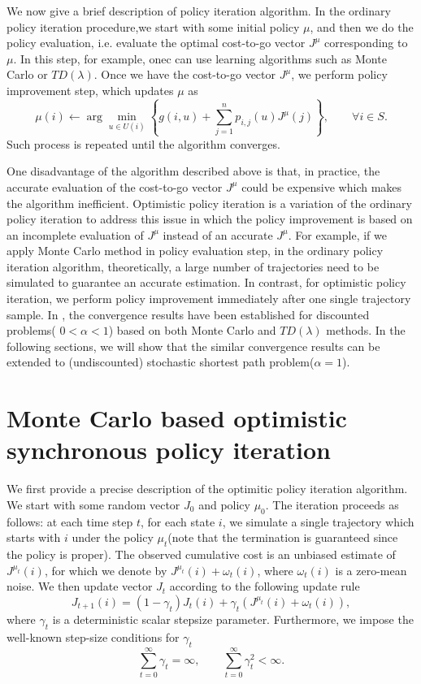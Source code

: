 \documentclass[12pt,a4paper]{amsart}
\numberwithin{equation}{section}
\theoremstyle{plain}
\theoremstyle{definition}
\begin{document}
We now give a brief description of policy iteration algorithm. In the ordinary policy iteration procedure,we start with some initial policy $\mu$, and then we do the policy evaluation, i.e. evaluate the optimal cost-to-go vector $J^{\mu}$ corresponding to $\mu$. In this step, for example, onec can use learning algorithms such as Monte Carlo or $TD(\lambda)$. Once we have the cost-to-go vector $J^{\mu}$, we perform policy improvement step, which updates $\mu$ as 
$$
\mu(i) \leftarrow \arg \min_{u \in U(i)} \left\{ g(i, u) + \sum_{j =1}^{n} p_{i,j}(u) J^{\mu} (j) \right\}, \qquad \forall i \in S. 
$$
Such process is repeated until the algorithm converges. 

One disadvantage of the algorithm described above is that, in practice,  the accurate evaluation of the cost-to-go vector $J^{\mu}$ could be expensive which makes the algorithm inefficient.  Optimistic policy iteration is a variation of the ordinary policy iteration to address this issue in which the policy improvement is based on an incomplete evaluation of $J^{\mu}$ instead of an accurate $J^{\mu}$.  For example, if we apply Monte Carlo method in policy evaluation step, in the ordinary policy iteration algorithm, theoretically, a large number of trajectories need to be simulated to guarantee an accurate estimation. In contrast, for optimistic policy iteration, we perform policy improvement immediately after one single trajectory sample.  In \cite{Ts03}, the convergence results have been established for discounted problems( $0<\alpha < 1$) based on both Monte Carlo and $TD(\lambda)$ methods. In the following sections, we will show that the similar convergence results can be extended to (undiscounted) stochastic shortest path problem($\alpha =1$). 

\section{Monte Carlo based optimistic synchronous policy iteration}
We first provide a precise description of the optimitic policy iteration algorithm. We start with some random vector $J_0$ and policy $\mu_0$. The iteration proceeds as follows: at each time step $t$,  for each state $i$, we simulate a single trajectory which starts with $i$ under the policy $\mu_t$(note that the termination is guaranteed since the policy is proper). The observed cumulative cost is an unbiased estimate of $J^{\mu_t}(i)$, for which we denote by $J^{\mu_t}(i) + \omega_t(i)$, where $\omega_t(i)$ is a zero-mean noise. We then update vector $J_t$ according to the following update rule
\begin{equation} \label{updaterule}
	J_{t+1} (i) = (1-\gamma_t) J_t(i) + \gamma_t (J^{\mu_t}(i) + \omega_t(i)),
\end{equation}
where $\gamma_t$ is a deterministic scalar stepsize parameter. Furthermore, we impose the well-known step-size conditions for $\gamma_t$
$$
\sum_{t=0}^{\infty} \gamma_t= \infty, \qquad \sum_{t=0}^{\infty} \gamma_t^2 < \infty. 
$$
\end{document}
